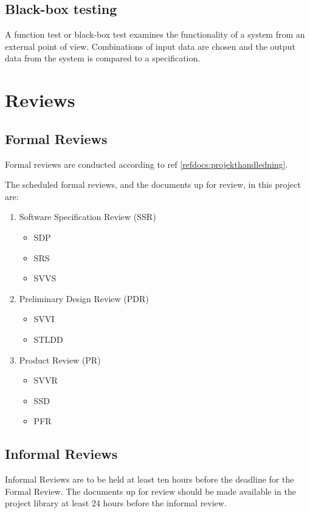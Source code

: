 \documentclass[a4paper]{article}
\begin{document}
\subsection{Black-box testing}
A function test or black-box test examines the functionality of a system from an external point of view. Combinations of input data are chosen and the output data from the system is compared to a specification.


\section{Reviews}

\subsection{Formal Reviews}
Formal reviews are conducted according to ref \ref{refdocs:projekthandledning}.

The scheduled formal reviews, and the documents up for review, in this project are:

\begin{enumerate}

\item Software Specification Review (SSR)
\begin{itemize}
\item SDP
\item SRS
\item SVVS
\end{itemize}


\item Preliminary Design Review (PDR)
\begin{itemize}
\item SVVI
\item STLDD
\end{itemize}


\item Product Review (PR)
\begin{itemize}
\item SVVR
\item SSD
\item PFR
\end{itemize}


\end{enumerate}


\subsection{Informal Reviews}
Informal Reviews are to be held at least ten hours before the deadline for the Formal Review. The documents up for review should be made available in the project library at least 24 hours before the informal review.
\end{document}
